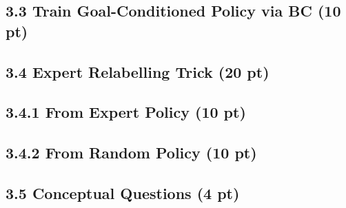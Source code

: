 \documentclass[12pt]{article}
\begin{document}
\subsection*{3.3 Train Goal-Conditioned Policy via BC (10 pt)}

\begin{tcolorbox}[fit,height=22em, width=40em, blank, borderline={1pt}{1pt},nobeforeafter]
\begin{center}

\end{center}
\end{tcolorbox}




\subsection*{3.4 Expert Relabelling Trick (20 pt)}
\subsection*{3.4.1 From Expert Policy (10 pt)}

\begin{tcolorbox}[fit,height=22em, width=40em, blank, borderline={1pt}{1pt},nobeforeafter]
\begin{center}

\end{center}
\end{tcolorbox}


\subsection*{3.4.2 From Random Policy (10 pt)}

\begin{tcolorbox}[fit,height=50em, width=40em, blank, borderline={1pt}{1pt},nobeforeafter]
\begin{center}

\end{center}
\end{tcolorbox}


\subsection*{3.5 Conceptual Questions (4 pt)}

\begin{tcolorbox}[fit,height=22em, width=40em, blank, borderline={1pt}{1pt},nobeforeafter]
\begin{center}

\end{center}
\end{tcolorbox}
\end{document}
